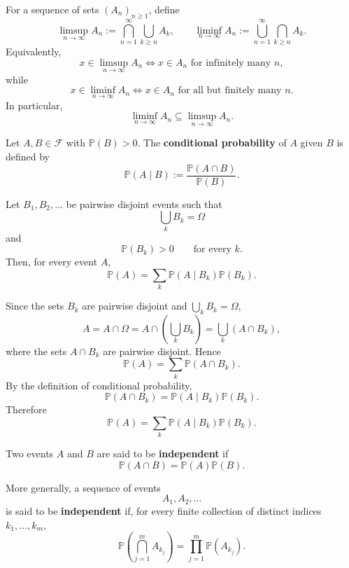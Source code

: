 \begin{definitionenv}
    For a sequence of sets $(A_n)_{n\ge1}$, define
    \[
        \limsup_{n\to\infty} A_n
        :=
        \bigcap_{n=1}^{\infty}\bigcup_{k\ge n} A_k,
        \qquad
        \liminf_{n\to\infty} A_n
        :=
        \bigcup_{n=1}^{\infty}\bigcap_{k\ge n} A_k.
    \]
    Equivalently,
    \[
        x\in\limsup_{n\to\infty}A_n
        \iff
        x\in A_n \text{ for infinitely many }n,
    \]
    while
    \[
        x\in\liminf_{n\to\infty}A_n
        \iff
        x\in A_n \text{ for all but finitely many }n.
    \]
    In particular,
    \[
        \liminf_{n\to\infty}A_n
        \subseteq
        \limsup_{n\to\infty}A_n.
    \]
\end{definitionenv}


\begin{definitionenv}
    Let $A,B\in\mathcal{F}$ with $\mathbb{P}(B)>0$.
    The \textbf{conditional probability} of $A$ given $B$ is defined by
    \[
        \mathbb{P}(A\mid B)
        :=
        \frac{\mathbb{P}(A\cap B)}{\mathbb{P}(B)}.
    \]
\end{definitionenv}

\begin{propositionenv}
    Let $B_1,B_2,\ldots$ be pairwise disjoint events such that
    \[
        \bigcup_k B_k=\Omega
    \]
    and
    \[
        \mathbb{P}(B_k)>0
        \qquad\text{for every }k.
    \]
    Then, for every event $A$,
    \[
        \mathbb{P}(A)
        =
        \sum_k
        \mathbb{P}(A\mid B_k)\mathbb{P}(B_k).
    \]
\end{propositionenv}

\begin{proofenv}
    Since the sets $B_k$ are pairwise disjoint and
    $\bigcup_k B_k=\Omega$,
    \[
        A
        =
        A\cap\Omega
        =
        A\cap\left(\bigcup_k B_k\right)
        =
        \bigcup_k (A\cap B_k),
    \]
    where the sets $A\cap B_k$ are pairwise disjoint. Hence
    \[
        \mathbb{P}(A)
        =
        \sum_k \mathbb{P}(A\cap B_k).
    \]
    By the definition of conditional probability,
    \[
        \mathbb{P}(A\cap B_k)
        =
        \mathbb{P}(A\mid B_k)\mathbb{P}(B_k).
    \]
    Therefore
    \[
        \mathbb{P}(A)
        =
        \sum_k
        \mathbb{P}(A\mid B_k)\mathbb{P}(B_k).
    \]
\end{proofenv}

\begin{definitionenv}
    Two events $A$ and $B$ are said to be \textbf{independent} if
    \[
        \mathbb{P}(A\cap B)
        =
        \mathbb{P}(A)\mathbb{P}(B).
    \]

    More generally, a sequence of events
    \[
        A_1,A_2,\ldots
    \]
    is said to be \textbf{independent} if, for every finite collection of
    distinct indices $k_1,\ldots,k_m$,
    \[
        \mathbb{P}\left(
            \bigcap_{j=1}^{m} A_{k_j}
        \right)
        =
        \prod_{j=1}^{m}
        \mathbb{P}(A_{k_j}).
    \]
\end{definitionenv}

